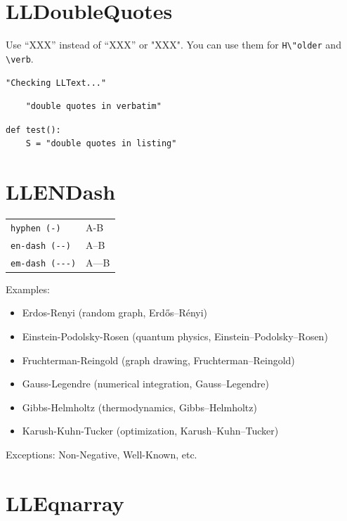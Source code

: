 \documentclass[a4paper]{article}
\begin{document}
\section{LLDoubleQuotes}

Use ``XXX'' instead of “XXX” or "XXX".
You can use them for \verb|H\"older| and \verb"\verb".


\verb|"Checking LLText..."|

\begin{verbatim}
	"double quotes in verbatim"
\end{verbatim}

\begin{lstlisting}
def test():
	S = "double quotes in listing"
\end{lstlisting}

\section{LLENDash}

\begin{table}[H]
	\centering
	\begin{tabular}{ll}
		\verb|hyphen (-)|    & A-B   \\
		\verb|en-dash (--)|  & A--B  \\
		\verb|em-dash (---)| & A---B
	\end{tabular}
\end{table}

Examples:
\begin{itemize}
	\item Erdos-Renyi (random graph, Erd\H{o}s--R\'enyi)
	\item Einstein-Podolsky-Rosen (quantum physics, Einstein--Podolsky--Rosen)
	\item Fruchterman-Reingold (graph drawing, Fruchterman--Reingold)
	\item Gauss-Legendre (numerical integration, Gauss--Legendre)
	\item Gibbs-Helmholtz (thermodynamics, Gibbs--Helmholtz)
	\item Karush-Kuhn-Tucker (optimization, Karush--Kuhn--Tucker)
\end{itemize}

Exceptions: Non-Negative,  Well-Known, etc.


\section{LLEqnarray}
\end{document}
